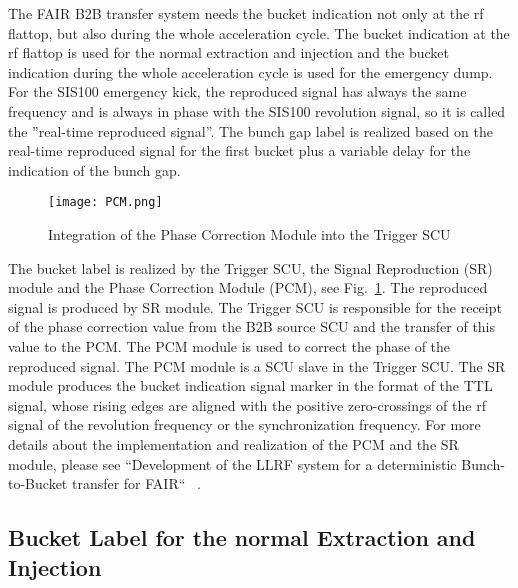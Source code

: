 



The FAIR B2B transfer system needs the bucket indication not only at the rf flattop, but also during the whole acceleration cycle. The bucket indication at the rf flattop is used for the normal extraction and injection and the bucket indication during the whole acceleration cycle is used for the emergency dump. For the SIS100 emergency kick, the reproduced signal has always the same frequency and is always in phase with the SIS100 revolution signal, so it is called the ''real-time reproduced signal''. The bunch gap label is realized based on the real-time reproduced signal for the first bucket plus a variable delay for the indication of the bunch gap.


 \begin{figure}[!htb]
   \centering   
   \texttt{[image: PCM.png]}
   \caption{Integration of the Phase Correction Module into the Trigger SCU}
   \label{PCM}
\end{figure}
The bucket label is realized by the Trigger SCU, the Signal Reproduction (SR) module and the Phase Correction Module (PCM), see Fig.~\ref{PCM}. The reproduced signal is produced by SR module. The Trigger SCU is responsible for the receipt of the phase correction value from the B2B source SCU and the transfer of this value to the PCM. The PCM module is used to correct the phase of the reproduced signal. The PCM module is a SCU slave in the Trigger SCU. The SR module produces the bucket indication signal marker in the format of the TTL signal, whose rising edges are aligned with the positive zero-crossings of the rf signal of the revolution frequency or the synchronization frequency. For more details about the implementation and realization of the PCM and the SR module, please see ``Development of the LLRF system for a deterministic Bunch-to-Bucket transfer for FAIR`` ~\cite{ferrand_development_????}. 

\subsection{Bucket Label for the normal Extraction and Injection}

